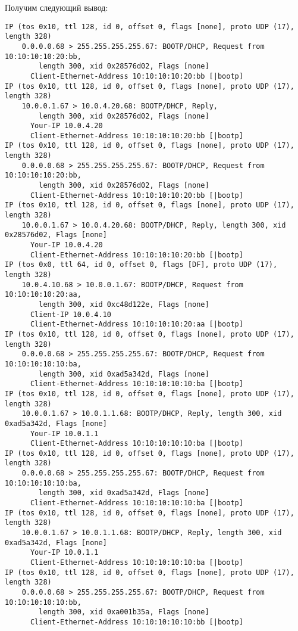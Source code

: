 \documentclass[a4paper,12pt]{article}
\begin{document}
Получим следующий вывод:
\begin{Verbatim}
IP (tos 0x10, ttl 128, id 0, offset 0, flags [none], proto UDP (17), length 328) 
	0.0.0.0.68 > 255.255.255.255.67: BOOTP/DHCP, Request from 10:10:10:10:20:bb, 
		length 300, xid 0x28576d02, Flags [none]
	  Client-Ethernet-Address 10:10:10:10:20:bb [|bootp]
IP (tos 0x10, ttl 128, id 0, offset 0, flags [none], proto UDP (17), length 328) 
	10.0.0.1.67 > 10.0.4.20.68: BOOTP/DHCP, Reply, 
		length 300, xid 0x28576d02, Flags [none]
	  Your-IP 10.0.4.20
	  Client-Ethernet-Address 10:10:10:10:20:bb [|bootp]
IP (tos 0x10, ttl 128, id 0, offset 0, flags [none], proto UDP (17), length 328) 
	0.0.0.0.68 > 255.255.255.255.67: BOOTP/DHCP, Request from 10:10:10:10:20:bb, 
		length 300, xid 0x28576d02, Flags [none]
	  Client-Ethernet-Address 10:10:10:10:20:bb [|bootp]
IP (tos 0x10, ttl 128, id 0, offset 0, flags [none], proto UDP (17), length 328) 
	10.0.0.1.67 > 10.0.4.20.68: BOOTP/DHCP, Reply, length 300, xid 0x28576d02, Flags [none]
	  Your-IP 10.0.4.20
	  Client-Ethernet-Address 10:10:10:10:20:bb [|bootp]
IP (tos 0x0, ttl 64, id 0, offset 0, flags [DF], proto UDP (17), length 328) 
	10.0.4.10.68 > 10.0.0.1.67: BOOTP/DHCP, Request from 10:10:10:10:20:aa, 
		length 300, xid 0xc48d122e, Flags [none]
	  Client-IP 10.0.4.10
	  Client-Ethernet-Address 10:10:10:10:20:aa [|bootp]
IP (tos 0x10, ttl 128, id 0, offset 0, flags [none], proto UDP (17), length 328) 
	0.0.0.0.68 > 255.255.255.255.67: BOOTP/DHCP, Request from 10:10:10:10:10:ba, 
		length 300, xid 0xad5a342d, Flags [none]
	  Client-Ethernet-Address 10:10:10:10:10:ba [|bootp]
IP (tos 0x10, ttl 128, id 0, offset 0, flags [none], proto UDP (17), length 328) 
	10.0.0.1.67 > 10.0.1.1.68: BOOTP/DHCP, Reply, length 300, xid 0xad5a342d, Flags [none]
	  Your-IP 10.0.1.1
	  Client-Ethernet-Address 10:10:10:10:10:ba [|bootp]
IP (tos 0x10, ttl 128, id 0, offset 0, flags [none], proto UDP (17), length 328) 
	0.0.0.0.68 > 255.255.255.255.67: BOOTP/DHCP, Request from 10:10:10:10:10:ba, 
		length 300, xid 0xad5a342d, Flags [none]
	  Client-Ethernet-Address 10:10:10:10:10:ba [|bootp]
IP (tos 0x10, ttl 128, id 0, offset 0, flags [none], proto UDP (17), length 328) 
	10.0.0.1.67 > 10.0.1.1.68: BOOTP/DHCP, Reply, length 300, xid 0xad5a342d, Flags [none]
	  Your-IP 10.0.1.1
	  Client-Ethernet-Address 10:10:10:10:10:ba [|bootp]
IP (tos 0x10, ttl 128, id 0, offset 0, flags [none], proto UDP (17), length 328) 
	0.0.0.0.68 > 255.255.255.255.67: BOOTP/DHCP, Request from 10:10:10:10:10:bb, 
		length 300, xid 0xa001b35a, Flags [none]
	  Client-Ethernet-Address 10:10:10:10:10:bb [|bootp]

\end{Verbatim}
\end{document}
